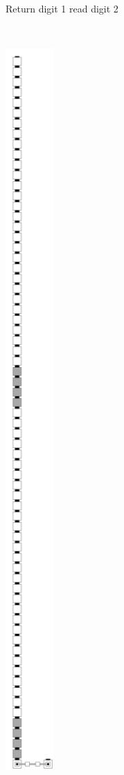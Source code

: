 \begin{figure}[H]
\begin{subfigure}[t]{0.2\textwidth}
                \caption{\label{fig:return_paths/return_digit1_read_digit2_general} Return digit 1 read digit 2}
            \end{subfigure}%
            ~
            \begin{subfigure}[t]{0.2\textwidth}
                \centering
                \includegraphics[width=0.2\textwidth]{return_paths/return_digit1_read_digit2_case2_msr}

\end{subfigure}
\end{figure}
